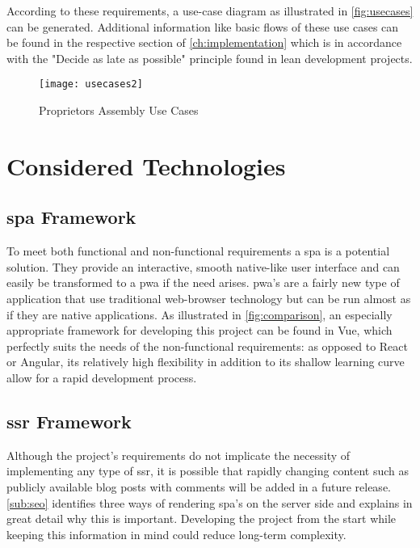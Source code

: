 According to these requirements, a use-case diagram as illustrated in \autoref{fig:usecases} can be generated. Additional information like basic flows of these use cases can be found in the respective section of \autoref{ch:implementation} which is in accordance with the "Decide as late as possible" principle found in lean development projects.

\begin{figure}[H]
    \begin{center}
    \texttt{[image: usecases2]}
    \end{center}
    \caption{Proprietors Assembly Use Cases}
    \label{fig:usecases}
\end{figure}

\section{Considered Technologies} \label{sec:consideredtech}
\subsection{\acrshort{spa} Framework}
To meet both functional and non-functional requirements a \acrfull{spa} is a potential solution. They provide an interactive, smooth native-like user interface and can easily be transformed to a \acrfull{pwa} if the need arises. \acrshort{pwa}'s are a fairly new type of application that use traditional web-browser technology but can be run almost as if they are native applications. As illustrated in \autoref{fig:comparison}, an especially appropriate framework for developing this project can be found in Vue, which perfectly suits the needs of the non-functional requirements: as opposed to React or Angular, its relatively high flexibility in addition to its shallow learning curve allow for a rapid development process.

\subsection{\acrshort{ssr} Framework}
Although the project's requirements do not implicate the necessity of implementing any type of \acrfull{ssr}, it is possible that rapidly changing content such as publicly available blog posts with comments will be added in a future release. \autoref{sub:seo} identifies three ways of rendering \acrshort{spa}'s on the server side and explains in great detail why this is important. Developing the project from the start while keeping this information in mind could reduce long-term complexity. 

